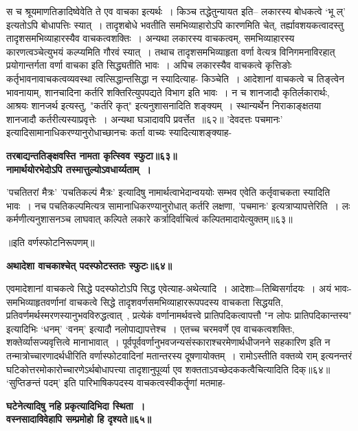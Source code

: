 {{{{ स च श्रूयमाणतिङादिष्वेवेति ते एव वाचका इत्यर्थः~।
किञ्च तद्धेतुन्यायत इति--
 लकारस्य बोधकत्वे `भू ल्' इत्यतोऽपि बोधापत्तिः स्यात्~।
तादृशबोधे भवतीति समभिव्याहारोऽपि कारणमिति चेत्, तर्ह्यावशयकत्वादस्तु तादृशसमभिव्याहारस्यैव वाचकत्वशक्तिः~।
 अन्यथा लकारस्य वाचकत्वम्, समभिव्याहारस्य कारणत्वञ्चेत्युभयं कल्प्यमिति गौरवं स्यात्~।
तथाच तादृशसमभिव्याहृता वर्णा वेत्यत्र विनिगमनाविरहात् प्रयोगान्तर्गता वर्णा वाचका इति सिद्ध्यतीति भावः~।
 अपिच लकारस्यैव वाचकत्वे कृत्तिङोः कर्तृभावनावाचकत्वव्यवस्था त्वत्सिद्धान्तसिद्धा न स्यादित्याह- किञ्चेति~। 
आदेशानां वाचकत्वे च तिङ्त्वेन भावनायाम्, शानचादिना कर्तरि शक्तिरित्युपपद्यते विभाग इति भावः~।
न च शानजादौ कृतिर्लकारार्थः, आश्रयः शानजर्थ इत्यस्तु, "कर्तरि कृत्" इत्यनुशासनादिति शङ्क्यम्~।
स्थान्यर्थेन निराकाङ्क्षतया शानजादौ कर्तरीत्यस्याप्रवृत्तेः~।
अन्यथा घञादावपि प्रवर्त्तेत~॥६२॥
'देवदत्तः पचमानः' इत्यादिसामानाधिकरण्यानुरोधाच्छानचः कर्ता वाच्यः स्यादित्याशङ्क्याह-
\begin{center}{\bfseries तरबाद्यन्ततिङ्क्षवस्ति नामता कृत्स्विव स्फुटा॥६३॥\\
 नामार्थयोरभेदोऽपि तस्मात्तुल्योऽवधार्य्यताम्~।}\end{center}

'पचतितरां मैत्रः' 'पचतिकल्पं मैत्रः' इत्यादिषु नामार्थत्वाभेदान्वययोः सम्भव एवेति कर्तृवाचकता स्यादिति भावः~।
नच पचतिकल्पमित्यत्र सामानाधिकरण्यानुरोधात् कर्तरि लक्षणा, 'पचमानः' इत्यत्राप्यापत्तेरिति~।
 लः कर्मणीत्यनुशासनञ्च लाघवात् कल्पिते लकारे कर्त्रादिर्वाचित्वं कल्पितमादायेत्युक्तम्॥६३॥
 
 \begin{center}॥इति वर्णस्फोटनिरूपणम्॥\end{center}
\begin{center}{\bfseries अथादेशा वाचकाश्चेत् पदस्फोटस्ततः स्फुटः॥६४॥}\end{center}
 एवमादेशानां वाचकत्वे सिद्धे पदस्फोटोऽपि सिद्ध एवेत्याह-अथेत्यादि~।
आदेशाः=तिब्विसर्गादयः~।
अयं भावः-समभिव्याहृतवर्णानां वाचकत्वे सिद्धे तादृशवर्णसमभिव्याहाररूपपदस्य वाचकता सिद्धयति, प्रतिवर्णमर्थस्मरणस्यानुभवविरुद्धत्वात्~, प्रत्येकं वर्णानामर्थवत्त्वे प्रातिपदिकत्वापत्तौ "न लोपः प्रातिपदिकान्तस्य" इत्यादिभिः `धनम्' `वनम्' इत्यादौ नलोपाद्यापत्तेश्च~।
 एतच्च चरमवर्णे एव वाचकत्वशक्तिः, शक्तेर्व्यासज्यवृत्तित्वे मानाभावात्~।
पूर्वपूर्ववर्णानुभवजन्यसंस्काराश्चरमेणार्थधीजनने सहकारिण इति न तन्मात्रोच्चारणादर्थधीरिति वर्णास्फोटवादिनां मतान्तरस्य दूषणायोक्तम्~।
रामोऽस्तीति वक्तव्ये राम् इत्यनन्तरं घटिकोत्तरमोकारोच्चारणेऽर्थबोधापत्त्या तादृशानुपूर्व्या एव शक्तताऽवच्छेदककत्वैचित्यादिति दिक्॥६४॥
 `सुप्तिङन्तं पदम्' इति पारिभाषिकपदस्य वाचकत्वस्वीकर्तॄणां मतमाह-
\begin{center}{\bfseries घटेनेत्यादिषु नहि प्रकृत्यादिभिदा स्थिता~।\\
 वस्नसादाविवेहापि सम्प्रमोहो हि दृश्यते॥६५॥}\end{center}

}}}}
